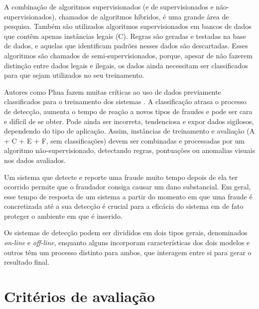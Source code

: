 A combinação de algoritmos supervisionados (e de supervisionados e não-supervisionados), chamados de algoritmos híbridos, é uma grande área de pesquisa. Também são utilizados algoritmos supervisionados em bancos de dados que contêm apenas instâncias legais (C). Regras são geradas e testadas na base de dados, e aquelas que identificam padrões nesses dados são descartadas. Esses algoritmos são chamados de semi-supervisionados, porque, apesar de não fazerem distinção entre dados legais e ilegais, os dados ainda necessitam ser classificados para que sejam utilizados no seu treinamento.

Autores como Phua fazem muitas críticas ao uso de dados previamente classificados para o treinamento dos sistemas \cite{Phua2010}. A classificação atrasa o processo de detecção, aumenta o tempo de reação a novos tipos de fraudes e pode ser cara e difícil de se obter. Pode ainda ser incorreta, tendenciosa e expor dados sigilosos, dependendo do tipo de aplicação. Assim, instâncias de treinamento e avaliação (A + C + E + F, sem classificações) devem ser combinadas e processadas por um algoritmo não-supervisionado, detectando regras, pontuações ou anomalias visuais nos dados avaliados.

Um sistema que detecte e reporte uma fraude muito tempo depois de ela ter ocorrido permite que o fraudador consiga causar um dano substancial. Em geral, esse tempo de resposta de um sistema a partir do momento em que uma fraude é concretizada até a sua detecção é crucial para a eficácia do sistema em de fato proteger o ambiente em que é inserido.

Os sistemas de detecção podem ser divididos em dois tipos gerais, denominados \emph{on-line} e \emph{off-line}, enquanto alguns incorporam características dos dois modelos e outros têm um processo distinto para ambos, que interagem entre si para gerar o resultado final.

\section{Critérios de avaliação}

